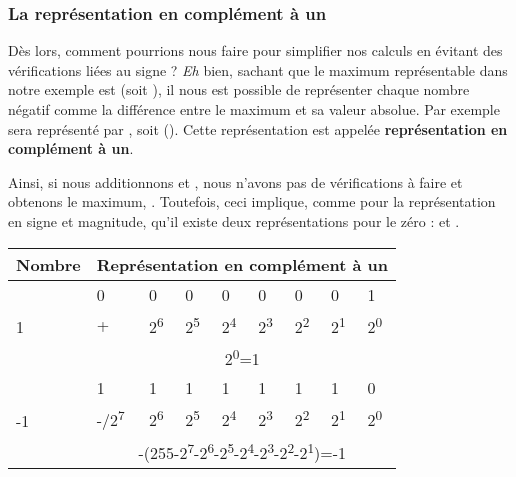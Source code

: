 \subsubsection{La représentation en complément à un}
\label{la-representation-en-complement-a-un}

Dès lors, comment pourrions nous faire pour simplifier nos calculs en
évitant des vérifications liées au signe ? \emph{Eh} bien, sachant que
le maximum représentable dans notre exemple est  (soit
), il nous est possible de représenter chaque nombre
négatif comme la différence entre le maximum et sa valeur absolue. Par
exemple  sera représenté par , soit
 (). Cette représentation est appelée
\textbf{représentation en complément à un}.

Ainsi, si nous additionnons  et , nous n'avons pas
de vérifications à faire et obtenons le maximum, .
Toutefois, ceci implique, comme pour la représentation en signe et
magnitude, qu'il existe deux représentations pour le zéro :
 et .

\begin{table}
\centering
\begin{tabular}{|l|l|l|l|l|l|l|l|l|}\hline
\rowcolor{gris-tab-entete}\bf Nombre& \multicolumn{8}{l|}{\bf Représentation en complément à un}\\
 \hline
  \multirow{3}{2cm}{1} & 0 & 0 & 0 & 0 & 0 & 0 & 0 & 1 \\ 
  \cline{2-9}
  &+&2\textsuperscript{6}&2\textsuperscript{5}&2\textsuperscript{4}&2\textsuperscript{3}&2\textsuperscript{2}&2\textsuperscript{1}&2\textsuperscript{0}\\ 
  \cline{2-9}
   &\multicolumn{8}{c|}{2\textsuperscript{0}=1}\\ 
  \hline
  \multirow{3}{2cm}{-1} & 1 & 1 & 1 & 1 & 1 & 1 & 1 & 0 \\ 
  \cline{2-9}
    &-/2\textsuperscript{7}&2\textsuperscript{6}&2\textsuperscript{5}&2\textsuperscript{4}&2\textsuperscript{3}&2\textsuperscript{2}&2\textsuperscript{1}&2\textsuperscript{0}\\ 
  \cline{2-9}
   &\multicolumn{8}{c|}{-(255-2\textsuperscript{7}-2\textsuperscript{6}-2\textsuperscript{5}-2\textsuperscript{4}-2\textsuperscript{3}-2\textsuperscript{2}-2\textsuperscript{1})=-1}\\ 
  \hline
\end{tabular}
\end{table}

